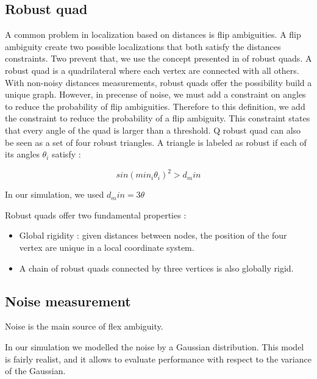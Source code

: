 \documentclass[letterpaper, 10 pt, conference]{ieeeconf}  %
\begin{document}
\subsection{Robust quad}
A common problem in localization based on distances is flip ambiguities. A flip ambiguity create two possible localizations that both satisfy the distances constraints. Two prevent that, we use the concept presented in \cite{MooreTeller} of robust quads.
A robust quad is a quadrilateral where each vertex are connected with all others.
With non-noisy distances measurements, robust quads offer the possibility build a unique graph. However, in precense of noise, we must add a constraint on angles to reduce the probability of flip ambiguities.
Therefore to this definition, we add the constraint to reduce the probability of a flip ambiguity. This constraint states that every angle of the quad is larger than a threshold. 
Q robust quad can also be seen as a set of four robust triangles. A triangle is labeled as robust if each of its angles $\theta_i$ satisfy : 

\begin{equation}
sin(min_i \theta_i)^2 > d_min
\end{equation}

In our simulation, we used $d_min = 3 \theta $



Robust quads offer two fundamental properties :
\begin{itemize}
\item Global rigidity : given distances between nodes, the position of the four vertex are unique in a local coordinate system.
\item A chain of robust quads connected by three vertices is also globally rigid.

\end{itemize}






\subsection{Noise measurement}
Noise is the main source of flex ambiguity. 

In our simulation we modelled the noise by a Gaussian distribution.
This model is fairly realist, and it allows to evaluate performance with respect to the variance of the Gaussian.
\end{document}
